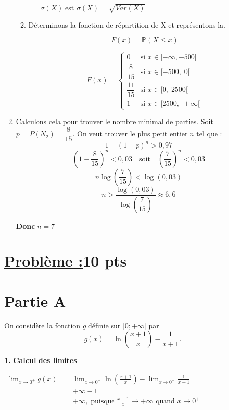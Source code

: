 \documentclass[12pt,a4paper]{article}
\begin{document}
\begin{enumerate}
\begin{enumerate}
\begin{itemize}
$\sigma(X)$ est $\sigma(X) = \sqrt{Var(X)}$
    \end{itemize}
    \item Déterminons la fonction de répartition de X et représentons la.

\[
F(x) = \mathbb{P}(X \leq x)
\]

\[
F(x) =
\begin{cases}
0 & \text{si } x \in ]{-\infty}, -500[ \\
\dfrac{8}{15} & \text{si } x \in [-500,\; 0[ \\
\dfrac{11}{15} & \text{si } x \in [0,\; 2500[ \\
1 & \text{si } x \in [2500,\; +\infty[
\end{cases}
\]


\end{enumerate}
\item Calculons cela pour trouver le nombre minimal de parties.
Soit \( p = P(N_2) = \dfrac{8}{15} \). On veut trouver le plus petit entier \( n \) tel que :
\[
1 - (1 - p)^n > 0{,}97
\]
\[
(1 - \dfrac{8}{15})^n < 0{,}03 \quad \text{soit} \quad \left( \dfrac{7}{15} \right)^n < 0{,}03
\]
\[
n \log\left( \dfrac{7}{15} \right) < \log(0{,}03)
\]
\[
n > \dfrac{\log(0{,}03)}{\log\left( \dfrac{7}{15} \right)} \approx 6{,}6
\]

\textbf{Donc } \( n = 7 \)

\end{enumerate}
\section*{\underline{Problème :}\quad\textbf{10 pts}}
\section*{Partie A}

On considère la fonction \( g \) définie sur \( ]0; +\infty[ \) par
\[
g(x) = \ln\left( \frac{x+1}{x} \right) - \frac{1}{x+1}.
\]

\bigskip

\textbf{1. Calcul des limites}

\(
\begin{aligned}
\lim_{x \to 0^{+}} g(x) 
&= \lim_{x \to 0^{+}} \ln\left( \frac{x+1}{x} \right) - \lim_{x \to 0^{+}} \frac{1}{x+1} \\
&= +\infty - 1 \\
&= +\infty,\text{ puisque }  \frac{x+1}{x} \to +\infty  \text{ quand } x \to 0^{+}
\end{aligned}
\)
\end{document}
